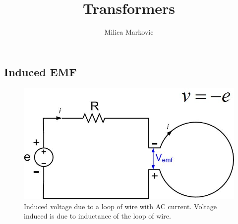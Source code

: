 \documentclass{ximera}
\title{Transformers}
\author{Milica Markovic}
\begin{document}
  
\begin{abstract}  

\end{abstract}  
\maketitle    





\subsection{Induced EMF}




\begin{figure}[htbp]
\begin{center}
\includegraphics[scale=0.5]{../jpg/inducedvoltage.jpg}
\end{center}
\caption{Induced voltage due to a loop of wire with AC current. Voltage induced is due to inductance of the loop of wire.}
\label{inducedemf}
\end{figure}
\end{document}
